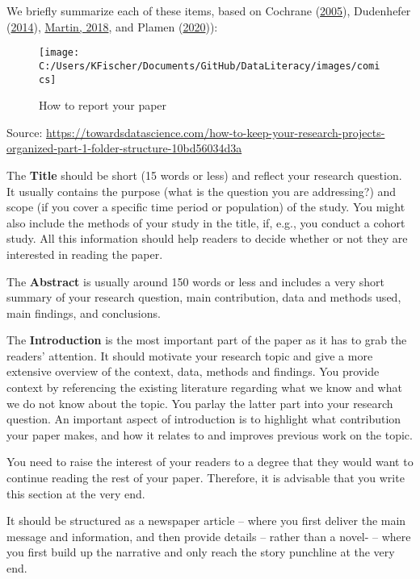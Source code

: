\documentclass[
]{book}
\begin{document}
We briefly summarize each of these items, based on Cochrane
(\protect\hyperlink{ref-cochrane_writing_2005}{2005}), Dudenhefer
(\protect\hyperlink{ref-dudenhefer_guide_2014}{2014}),
\href{https://www.youtube.com/watch?v=Vky9PDKx5KU}{Martin, 2018}, and
Plamen (\protect\hyperlink{ref-plamen_writing_2020}{2020})):

\begin{figure}

{\centering \texttt{[image: C:/Users/KFischer/Documents/GitHub/DataLiteracy/images/comics]} 

}

\caption{How to report your paper}\label{fig:writepaper}
\end{figure}

Source:
\url{https://towardsdatascience.com/how-to-keep-your-research-projects-organized-part-1-folder-structure-10bd56034d3a}

The \textbf{Title} should be short (15 words or less) and reflect your
research question. It usually contains the purpose (what is the question
you are addressing?) and scope (if you cover a specific time period or
population) of the study. You might also include the methods of your
study in the title, if, e.g., you conduct a cohort study. All this
information should help readers to decide whether or not they are
interested in reading the paper.

The \textbf{Abstract} is usually around 150 words or less and includes a
very short summary of your research question, main contribution, data
and methods used, main findings, and conclusions.

The \textbf{Introduction} is the most important part of the paper as it
has to grab the readers' attention. It should motivate your research
topic and give a more extensive overview of the context, data, methods
and findings. You provide context by referencing the existing literature
regarding what we know and what we do not know about the topic. You
parlay the latter part into your research question. An important aspect
of introduction is to highlight what contribution your paper makes, and
how it relates to and improves previous work on the topic.

You need to raise the interest of your readers to a degree that they
would want to continue reading the rest of your paper. Therefore, it is
advisable that you write this section at the very end.

It should be structured as a newspaper article -- where you first
deliver the main message and information, and then provide details --
rather than a novel- -- where you first build up the narrative and only
reach the story punchline at the very end.
\end{document}
